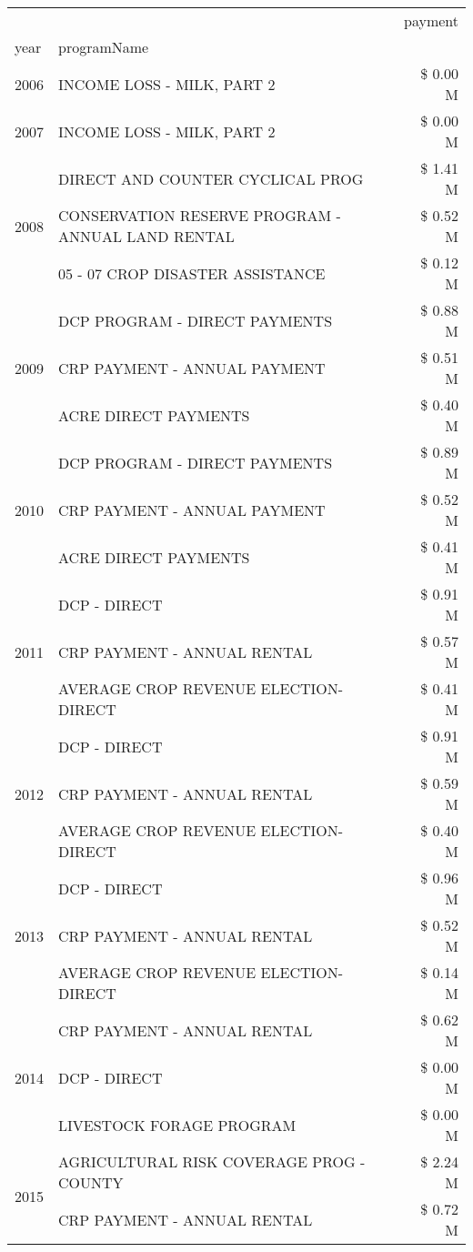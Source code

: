 \begin{tabular}{llr}
\toprule
 &  & payment \\
year & programName &  \\
\midrule
2006 & INCOME LOSS - MILK, PART 2 & \$ 0.00 M \\
\cline{1-3}
2007 & INCOME LOSS - MILK, PART 2 & \$ 0.00 M \\
\cline{1-3}
\multirow[t]{3}{*}{2008} & DIRECT AND COUNTER CYCLICAL PROG & \$ 1.41 M \\
 & CONSERVATION RESERVE PROGRAM - ANNUAL LAND RENTAL & \$ 0.52 M \\
 & 05 - 07 CROP DISASTER ASSISTANCE & \$ 0.12 M \\
\cline{1-3}
\multirow[t]{3}{*}{2009} & DCP PROGRAM - DIRECT PAYMENTS & \$ 0.88 M \\
 & CRP PAYMENT - ANNUAL PAYMENT & \$ 0.51 M \\
 & ACRE DIRECT PAYMENTS & \$ 0.40 M \\
\cline{1-3}
\multirow[t]{3}{*}{2010} & DCP PROGRAM - DIRECT PAYMENTS & \$ 0.89 M \\
 & CRP PAYMENT - ANNUAL PAYMENT & \$ 0.52 M \\
 & ACRE DIRECT PAYMENTS & \$ 0.41 M \\
\cline{1-3}
\multirow[t]{3}{*}{2011} & DCP - DIRECT & \$ 0.91 M \\
 & CRP PAYMENT - ANNUAL RENTAL & \$ 0.57 M \\
 & AVERAGE CROP REVENUE ELECTION-DIRECT & \$ 0.41 M \\
\cline{1-3}
\multirow[t]{3}{*}{2012} & DCP - DIRECT & \$ 0.91 M \\
 & CRP PAYMENT - ANNUAL RENTAL & \$ 0.59 M \\
 & AVERAGE CROP REVENUE ELECTION-DIRECT & \$ 0.40 M \\
\cline{1-3}
\multirow[t]{3}{*}{2013} & DCP - DIRECT & \$ 0.96 M \\
 & CRP PAYMENT - ANNUAL RENTAL & \$ 0.52 M \\
 & AVERAGE CROP REVENUE ELECTION-DIRECT & \$ 0.14 M \\
\cline{1-3}
\multirow[t]{3}{*}{2014} & CRP PAYMENT - ANNUAL RENTAL & \$ 0.62 M \\
 & DCP - DIRECT & \$ 0.00 M \\
 & LIVESTOCK FORAGE PROGRAM & \$ 0.00 M \\
\cline{1-3}
\multirow[t]{3}{*}{2015} & AGRICULTURAL RISK COVERAGE PROG - COUNTY & \$ 2.24 M \\
 & CRP PAYMENT - ANNUAL RENTAL & \$ 0.72 M \\

\end{tabular}
